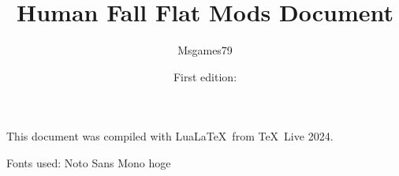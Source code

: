 \documentclass[lualatex,a4paper,fontsize=11pt,jafontscale=0.9247,titlepage,oneside]{jlreq}
\begin{document}
\title{Human Fall Flat Mods Document}
\author{Msgames79}
\date{First edition:\;\todayen}
\maketitle
This document was compiled with Lua\LaTeX\ from \TeX\ Live 2024.\par
Fonts used: Noto Sans Mono
\tableofcontents
\clearpage
hoge
\end{document}
